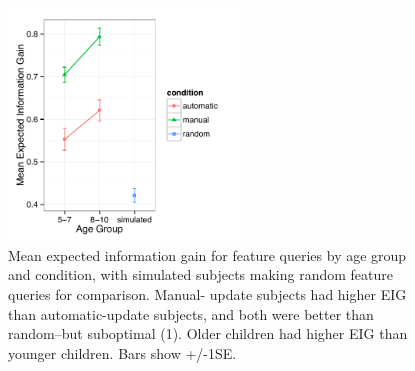 \documentclass[man,floatsintext]{apa6}
\begin{document}
\begin{figure}[t]
  \centering
  \includegraphics[width=0.55\textwidth]{figures/EIG_by_ageGroup_n_condition}
  \caption{Mean expected information gain for feature queries by age group and condition, 
with simulated subjects making random feature queries for comparison. Manual-
update subjects had higher EIG than automatic-update subjects, and both were 
better than random--but suboptimal (1). Older children had higher EIG than younger children. Bars show +/-1SE.}
  \label{fig:EIG_by_age}
\end{figure} 





\end{document}
